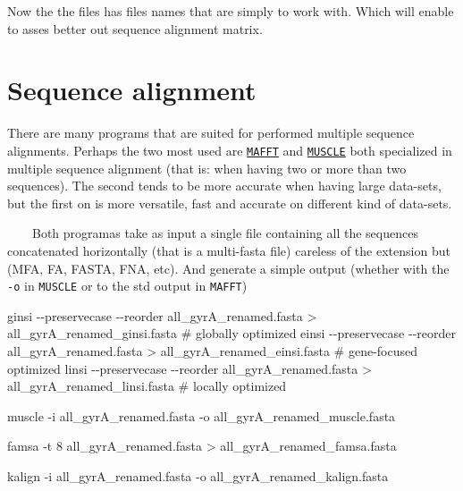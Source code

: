 \documentclass[
  letterpaper,
]{scrbook}
\newenvironment{Shaded}{\begin{snugshade}}{\end{snugshade}}
\newcommand{\AttributeTok}[1]{\textcolor[rgb]{0.40,0.46,0.14}{#1}}
\newcommand{\CommentTok}[1]{\textcolor[rgb]{0.37,0.37,0.37}{#1}}
\newcommand{\ExtensionTok}[1]{\textcolor[rgb]{0.00,0.46,0.62}{#1}}
\newcommand{\NormalTok}[1]{\textcolor[rgb]{0.00,0.46,0.62}{#1}}
\newcommand{\OperatorTok}[1]{\textcolor[rgb]{0.37,0.37,0.37}{#1}}
\begin{document}
Now the the files has files names that are simply to work with. Which
will enable to asses better out sequence alignment matrix.

\hypertarget{sequence-alignment}{%
\section*{Sequence alignment}\label{sequence-alignment}}

There are many programs that are suited for performed multiple sequence
alignments. Perhaps the two most used are
\href{https://mafft.cbrc.jp/alignment/software/}{\texttt{MAFFT}} and
\href{https://drive5.com/muscle5/}{\texttt{MUSCLE}} both specialized in
multiple sequence alignment (that is: when having two or more than two
sequences). The second tends to be more accurate when having large
data-sets, but the first on is more versatile, fast and accurate on
different kind of data-sets.

~~~~Both programas take as input a single file containing all the
sequences concatenated horizontally (that is a multi-fasta file)
careless of the extension but (MFA, FA, FASTA, FNA, etc). And generate a
simple output (whether with the \texttt{-o} in \texttt{MUSCLE} or to the
std output in \texttt{MAFFT}) ~~~~

\begin{Shaded}
\begin{Highlighting}[]

\ExtensionTok{ginsi} \AttributeTok{{-}{-}preservecase} \AttributeTok{{-}{-}reorder}\NormalTok{ all\_gyrA\_renamed.fasta }\OperatorTok{\textgreater{}}\NormalTok{ all\_gyrA\_renamed\_ginsi.fasta }\CommentTok{\# globally optimized}
\ExtensionTok{einsi} \AttributeTok{{-}{-}preservecase} \AttributeTok{{-}{-}reorder}\NormalTok{ all\_gyrA\_renamed.fasta }\OperatorTok{\textgreater{}}\NormalTok{ all\_gyrA\_renamed\_einsi.fasta }\CommentTok{\# gene{-}focused optimized}
\ExtensionTok{linsi} \AttributeTok{{-}{-}preservecase} \AttributeTok{{-}{-}reorder}\NormalTok{ all\_gyrA\_renamed.fasta }\OperatorTok{\textgreater{}}\NormalTok{ all\_gyrA\_renamed\_linsi.fasta }\CommentTok{\# locally optimized}

\ExtensionTok{muscle} \AttributeTok{{-}i}\NormalTok{ all\_gyrA\_renamed.fasta }\AttributeTok{{-}o}\NormalTok{ all\_gyrA\_renamed\_muscle.fasta}

\ExtensionTok{famsa} \AttributeTok{{-}t}\NormalTok{ 8 all\_gyrA\_renamed.fasta }\OperatorTok{\textgreater{}}\NormalTok{ all\_gyrA\_renamed\_famsa.fasta}

\ExtensionTok{kalign} \AttributeTok{{-}i}\NormalTok{ all\_gyrA\_renamed.fasta }\AttributeTok{{-}o}\NormalTok{ all\_gyrA\_renamed\_kalign.fasta}
\end{Highlighting}
\end{Shaded}
\end{document}
